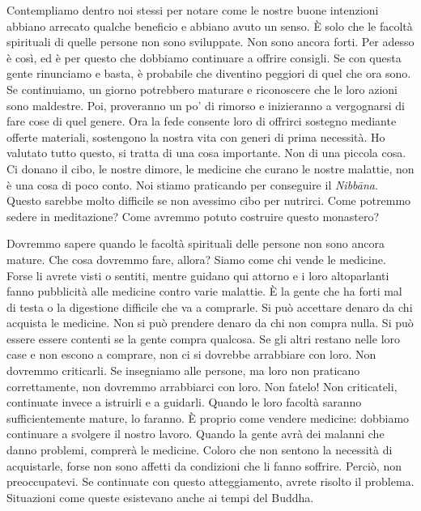 Contempliamo dentro noi stessi per notare come le nostre buone
intenzioni abbiano arrecato qualche beneficio e abbiano avuto un senso.
È solo che le facoltà spirituali di quelle persone non sono sviluppate.
Non sono ancora forti. Per adesso è così, ed è per questo che dobbiamo
continuare a offrire consigli. Se con questa gente rinunciamo e basta, è
probabile che diventino peggiori di quel che ora sono. Se continuiamo,
un giorno potrebbero maturare e riconoscere che le loro azioni sono
maldestre. Poi, proveranno un po' di rimorso e inizieranno a vergognarsi
di fare cose di quel genere. Ora la fede consente loro di offrirci
sostegno mediante offerte materiali, sostengono la nostra vita con
generi di prima necessità. Ho valutato tutto questo, si tratta di una
cosa importante. Non di una piccola cosa. Ci donano il cibo, le nostre
dimore, le medicine che curano le nostre malattie, non è una cosa di
poco conto. Noi stiamo praticando per conseguire il \emph{Nibbāna}.
Questo sarebbe molto difficile se non avessimo cibo per nutrirci. Come
potremmo sedere in meditazione? Come avremmo potuto costruire questo
monastero?

Dovremmo sapere quando le facoltà spirituali delle persone non sono
ancora mature. Che cosa dovremmo fare, allora? Siamo come chi vende le
medicine. Forse li avrete visti o sentiti, mentre guidano qui attorno e
i loro altoparlanti fanno pubblicità alle medicine contro varie
malattie. È la gente che ha forti mal di testa o la digestione difficile
che va a comprarle. Si può accettare denaro da chi acquista le medicine.
Non si può prendere denaro da chi non compra nulla. Si può essere essere
contenti se la gente compra qualcosa. Se gli altri restano nelle loro
case e non escono a comprare, non ci si dovrebbe arrabbiare con loro.
Non dovremmo criticarli. Se insegniamo alle persone, ma loro non
praticano correttamente, non dovremmo arrabbiarci con loro. Non fatelo!
Non criticateli, continuate invece a istruirli e a guidarli. Quando le
loro facoltà saranno sufficientemente mature, lo faranno. È proprio come
vendere medicine: dobbiamo continuare a svolgere il nostro lavoro.
Quando la gente avrà dei malanni che danno problemi, comprerà le
medicine. Coloro che non sentono la necessità di acquistarle, forse non
sono affetti da condizioni che li fanno soffrire. Perciò, non
preoccupatevi. Se continuate con questo atteggiamento, avrete risolto il
problema. Situazioni come queste esistevano anche ai tempi del Buddha.

